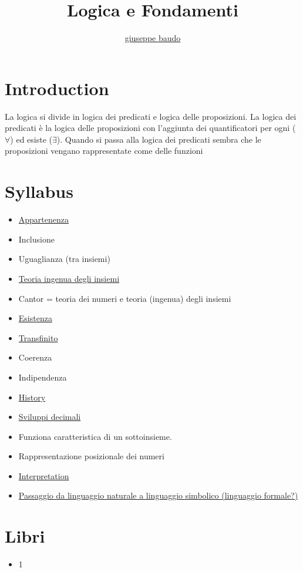 \documentclass[a4paper,10pt]{article}
\title{Logica e Fondamenti}
\author{\href{http://www.baudo.hol.es}{giuseppe baudo}}
\begin{document}
\maketitle

\section{Introduction}
La logica si divide in logica dei predicati e logica delle proposizioni. La logica dei predicati è la logica delle proposizioni con l'aggiunta dei quantificatori
per ogni ($\forall$) ed esiste ($\exists$). Quando si passa alla logica dei predicati sembra che le proposizioni vengano rappresentate come delle funzioni

\section{Syllabus}
\begin{itemize}
 \item \href{Appartenenza.html}{Appartenenza}
 \item Inclusione
 \item Uguaglianza (tra insiemi)
 \item \href{TeoriaIngenuaInsiemi.html}{Teoria ingenua degli insiemi}
 \item Cantor = teoria dei numeri e teoria (ingenua) degli insiemi
 \item \href{./Esistenza.html}{Esistenza}
 \item \href{./Transfinito.html}{Transfinito}
 \item Coerenza
 \item Indipendenza
 \item \href{../history/history.html}{History}
 \item \href{./SviluppiDecimali.html}{Sviluppi decimali}
 \item Funziona caratteristica di un sottoinsieme.
 \item Rappresentazione posizionale dei numeri
 \item \href{./Interpretation.html}{Interpretation}
 \item \href{./Passaggio.html}{Passaggio da linguaggio naturale a linguaggio simbolico (linguaggio formale?)}
\end{itemize}

\section{Libri}
  \begin{itemize}
   \item 1
  \end{itemize}
\end{document}
